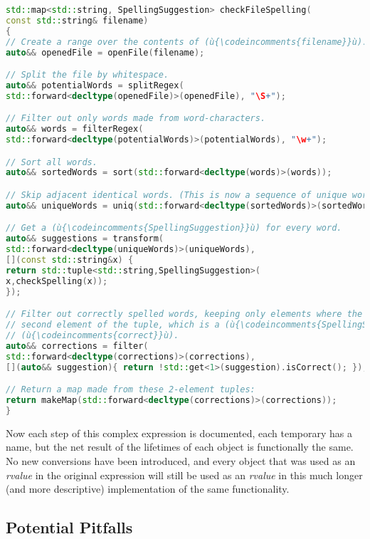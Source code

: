 \begin{lstlisting}[language=C++]
std::map<std::string, SpellingSuggestion> checkFileSpelling(
const std::string& filename)
{
// Create a range over the contents of (ù{\codeincomments{filename}}ù).
auto&& openedFile = openFile(filename);

// Split the file by whitespace.
auto&& potentialWords = splitRegex(
std::forward<decltype(openedFile)>(openedFile), "\S+");

// Filter out only words made from word-characters.
auto&& words = filterRegex(
std::forward<decltype(potentialWords)>(potentialWords), "\w+");

// Sort all words.
auto&& sortedWords = sort(std::forward<decltype(words)>(words));

// Skip adjacent identical words. (This is now a sequence of unique words.)
auto&& uniqueWords = uniq(std::forward<decltype(sortedWords)>(sortedWords));

// Get a (ù{\codeincomments{SpellingSuggestion}}ù) for every word.
auto&& suggestions = transform(
std::forward<decltype(uniqueWords)>(uniqueWords),
[](const std::string&x) {
return std::tuple<std::string,SpellingSuggestion>(
x,checkSpelling(x));
});

// Filter out correctly spelled words, keeping only elements where the
// second element of the tuple, which is a (ù{\codeincomments{SpellingSuggestion}}ù), is not
// (ù{\codeincomments{correct}}ù).
auto&& corrections = filter(
std::forward<decltype(corrections)>(corrections),
[](auto&& suggestion){ return !std::get<1>(suggestion).isCorrect(); });

// Return a map made from these 2-element tuples:
return makeMap(std::forward<decltype(corrections)>(corrections));
}
\end{lstlisting}

\noindent Now each step of this complex expression is documented, each temporary
has a name, but the net result of the lifetimes of each object is
functionally the same. No new conversions have been introduced, and
every object that was used as an \emph{rvalue} in the original
expression will still be used as an \emph{rvalue} in this much longer
(and more descriptive) implementation of the same functionality.

\subsection[Potential Pitfalls]{Potential Pitfalls}\label{potential-pitfalls}

